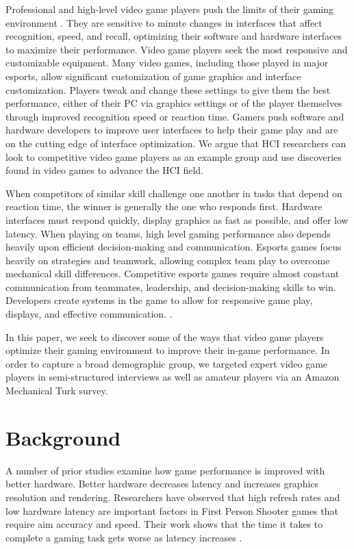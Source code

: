 \documentclass[11pt,manuscript,screen,review]{acmart} %
\begin{document}
Professional and high-level video game players push the limits of their gaming environment \cite{schell2018}. They are sensitive to minute changes in interfaces that affect recognition, speed, and recall, optimizing their software and hardware interfaces to maximize their performance. Video game players seek the most responsive and customizable equipment. Many video games, including those played in major esports, allow significant customization of game graphics and interface customization. Players tweak and change these settings to give them the best performance, either of their PC via graphics settings or of the player themselves through improved recognition speed or reaction time. Gamers push software and hardware developers to improve user interfaces to help their game play and are on the cutting edge of interface optimization. \cite{schell2018} We argue that HCI researchers can look to competitive video game players as an example group and use discoveries found in video games to advance the HCI field.

When competitors of similar skill challenge one another in tasks that depend on reaction time, the winner is generally the one who responds first. Hardware interfaces must respond quickly, display graphics as fast as possible, and offer low latency. When playing on teams, high level gaming performance also depends heavily upon efficient decision-making and communication. Esports games focus heavily on strategies and teamwork, allowing complex team play to overcome mechanical skill differences. Competitive esports games require almost constant communication from teammates, leadership, and decision-making skills to win. Developers create systems in the game to allow for responsive game play, displays, and effective communication. \cite{Alharthi2018}. 

In this paper, we seek to discover some of the ways that video game players optimize their gaming environment to improve their in-game performance. In order to capture a broad demographic group, we targeted expert video game players in semi-structured interviews as well as amateur players via an Amazon Mechanical Turk survey. 

\section{Background} %
A number of prior studies examine how game performance is improved with better hardware. Better hardware decreases latency and increases graphics resolution and rendering. Researchers have observed that high refresh rates \cite{spjut2019} and low hardware latency are important factors in First Person Shooter games that require aim accuracy and speed. Their work shows that the time it takes to complete a gaming task gets worse as latency increases \cite{spjut2021}.
\end{document}
